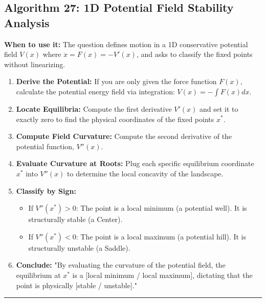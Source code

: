 \documentclass[11pt, a4paper]{report}
\begin{document}
\subsection*{Algorithm 27: 1D Potential Field Stability Analysis}
\textbf{When to use it:} The question defines motion in a 1D conservative potential field $V(x)$ where $\ddot{x} = F(x) = -V'(x)$, and asks to classify the fixed points without linearizing.
\begin{enumerate}[label=\textbf{\arabic*.}]
    \item \textbf{Derive the Potential:} If you are only given the force function $F(x)$, calculate the potential energy field via integration: $V(x) = -\int F(x) dx$.
    \item \textbf{Locate Equilibria:} Compute the first derivative $V'(x)$ and set it to exactly zero to find the physical coordinates of the fixed points $x^*$.
    \item \textbf{Compute Field Curvature:} Compute the second derivative of the potential function, $V''(x)$.
    \item \textbf{Evaluate Curvature at Roots:} Plug each specific equilibrium coordinate $x^*$ into $V''(x)$ to determine the local concavity of the landscape.
    \item \textbf{Classify by Sign:} 
    \begin{itemize}
        \item If $V''(x^*) > 0$: The point is a local minimum (a potential well). It is structurally stable (a Center).
        \item If $V''(x^*) < 0$: The point is a local maximum (a potential hill). It is structurally unstable (a Saddle).
    \end{itemize}
    \item \textbf{Conclude:} "By evaluating the curvature of the potential field, the equilibrium at $x^*$ is a [local minimum / local maximum], dictating that the point is physically [stable / unstable]."
\end{enumerate}
\vspace{1em}
\noindent\rule{\textwidth}{0.4pt}
\vspace{1em}
\end{document}
